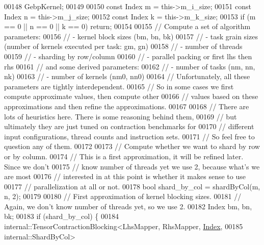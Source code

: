 \begin{DoxyCode}
00148         GebpKernel;
00149 
00150     \textcolor{keyword}{const} Index m = this->m\_i\_size;
00151     \textcolor{keyword}{const} Index n = this->m\_j\_size;
00152     \textcolor{keyword}{const} Index k = this->m\_k\_size;
00153     \textcolor{keywordflow}{if} (m == 0 || n == 0 || k == 0) \textcolor{keywordflow}{return};
00154 
00155     \textcolor{comment}{// Compute a set of algorithm parameters:}
00156     \textcolor{comment}{// - kernel block sizes (bm, bn, bk)}
00157     \textcolor{comment}{// - task grain sizes (number of kernels executed per task: gm, gn)}
00158     \textcolor{comment}{// - number of threads}
00159     \textcolor{comment}{// - sharding by row/column}
00160     \textcolor{comment}{// - parallel packing or first lhs then rhs}
00161     \textcolor{comment}{// and some derived parameters:}
00162     \textcolor{comment}{// - number of tasks (nm, nn, nk)}
00163     \textcolor{comment}{// - number of kernels (nm0, nn0)}
00164     \textcolor{comment}{// Unfortunately, all these parameters are tightly interdependent.}
00165     \textcolor{comment}{// So in some cases we first compute approximate values, then compute other}
00166     \textcolor{comment}{// values based on these approximations and then refine the approximations.}
00167 
00168     \textcolor{comment}{// There are lots of heuristics here. There is some reasoning behind them,}
00169     \textcolor{comment}{// but ultimately they are just tuned on contraction benchmarks for}
00170     \textcolor{comment}{// different input configurations, thread counts and instruction sets.}
00171     \textcolor{comment}{// So feel free to question any of them.}
00172 
00173     \textcolor{comment}{// Compute whether we want to shard by row or by column.}
00174     \textcolor{comment}{// This is a first approximation, it will be refined later. Since we don't}
00175     \textcolor{comment}{// know number of threads yet we use 2, because what's we are most}
00176     \textcolor{comment}{// interested in at this point is whether it makes sense to use}
00177     \textcolor{comment}{// parallelization at all or not.}
00178     \textcolor{keywordtype}{bool} shard\_by\_col = shardByCol(m, n, 2);
00179 
00180     \textcolor{comment}{// First approximation of kernel blocking sizes.}
00181     \textcolor{comment}{// Again, we don't know number of threads yet, so we use 2.}
00182     Index bm, bn, bk;
00183     \textcolor{keywordflow}{if} (shard\_by\_col) \{
00184       internal::TensorContractionBlocking<LhsMapper, RhsMapper, \hyperlink{namespace_eigen_a62e77e0933482dafde8fe197d9a2cfde}{Index},
00185                                           internal::ShardByCol>

\end{DoxyCode}
